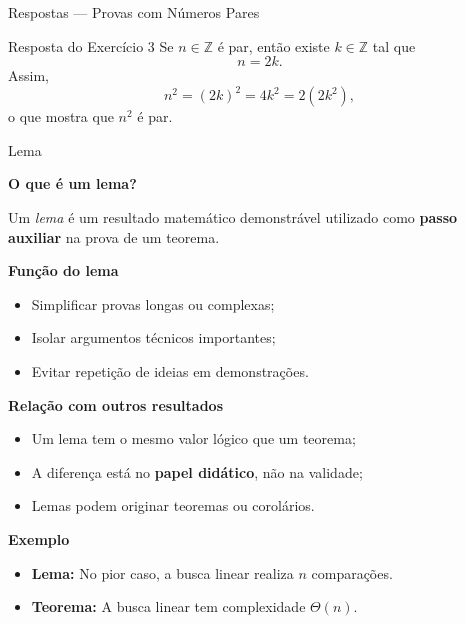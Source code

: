 \documentclass[9pt]{beamer}
\begin{document}
\begin{frame}{Respostas — Provas com Números Pares}
\begin{block}{Resposta do Exercício 3}
Se \(n \in \mathbb{Z}\) é par, então existe \(k \in \mathbb{Z}\) tal que
\[
n = 2k.
\]
Assim,
\[
n^2 = (2k)^2 = 4k^2 = 2(2k^2),
\]
o que mostra que \(n^2\) é par. 
\end{block}

\end{frame}

\begin{frame}{Lema}

\textbf{O que é um lema?}

Um \emph{lema} é um resultado matemático demonstrável
utilizado como \textbf{passo auxiliar} na prova de um teorema.

\vspace{0.4cm}

\textbf{Função do lema}

\begin{itemize}
\item Simplificar provas longas ou complexas;
\item Isolar argumentos técnicos importantes;
\item Evitar repetição de ideias em demonstrações.
\end{itemize}

\vspace{0.4cm}

\textbf{Relação com outros resultados}

\begin{itemize}
\item Um lema tem o mesmo valor lógico que um teorema;
\item A diferença está no \textbf{papel didático}, não na validade;
\item Lemas podem originar teoremas ou corolários.
\end{itemize}

\vspace{0.4cm}

\textbf{Exemplo}

\begin{itemize}
\item \textbf{Lema:} No pior caso, a busca linear realiza \( n \) comparações.
\item \textbf{Teorema:} A busca linear tem complexidade \( \Theta(n) \).
\end{itemize}

\end{frame}
\end{document}
